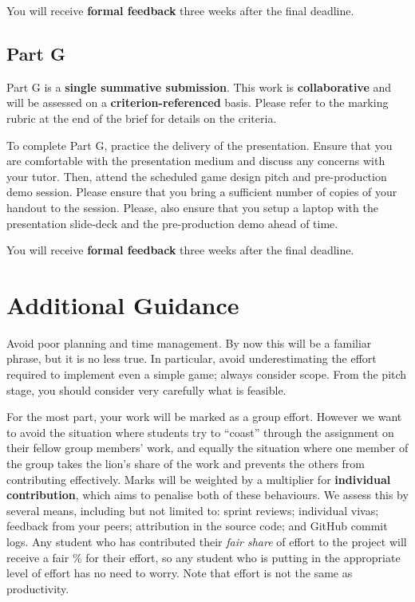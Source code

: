 \documentclass{../fal_assignment}
\begin{document}
You will receive \textbf{formal feedback} three weeks after the final deadline.

\subsection*{Part G}

Part G is a \textbf{single summative submission}. This work is \textbf{collaborative} and will be assessed on a \textbf{criterion-referenced} basis. Please refer to the marking rubric at the end of the brief for details on the criteria.

To complete Part G, practice the delivery of the presentation. Ensure that you are comfortable with the presentation medium and discuss any concerns with your tutor. Then, attend the scheduled game design pitch and pre-production demo session. Please ensure that you bring a sufficient number of copies of your handout to the session. Please, also ensure that you setup a laptop with the presentation slide-deck and the pre-production demo ahead of time.

You will receive \textbf{formal feedback} three weeks after the final deadline.

\section*{Additional Guidance}

Avoid poor planning and time management. By now this will be a familiar phrase, but it is no less true.
In particular, avoid underestimating the effort required to implement even a simple game; always consider scope.
From the pitch stage, you should consider very carefully what is feasible.

For the most part, your work will be marked as a group effort.
However we want to avoid the situation where students try to ``coast'' through the assignment
on their fellow group members' work,
and equally the situation where one member of the group takes the lion's share of the work
and prevents the others from contributing effectively.
Marks will be weighted by a multiplier for \textbf{individual contribution},
which aims to penalise both of these behaviours.
We assess this by several means, including but not limited to: sprint reviews; individual vivas; feedback from your peers;
attribution in the source code; and GitHub commit logs.
Any student who has contributed their \textit{fair share} of effort to the project will receive a fair \% for their effort,
so any student who is putting in the appropriate level of effort has no need to worry.
Note that effort is not the same as productivity.
\end{document}
